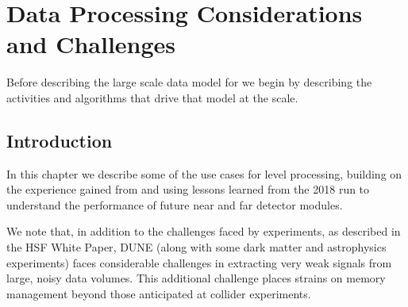 \documentclass[../main-v1.tex]{subfiles}
\begin{document}
\chapter{Data Processing Considerations and Challenges}%
\label{ch:use}
\newcommand{\ignore}[1]{{}}
Before describing the large scale data model for  we begin by describing the activities and algorithms that drive that model at the  scale. 

\section{Introduction }

In this chapter  we describe some of the use cases for  level processing,   %
building on the experience gained from   and   using lessons learned from the 2018 run to understand the performance of future near and far detector modules. 

We note that, in addition to the challenges faced by  experiments, as described in the HSF White Paper\cite{HEPSoftwareFoundation:2017ggl}, DUNE (along with some dark matter and astrophysics experiments) faces considerable challenges in extracting very weak signals from large, noisy data volumes.  This additional challenge places strains on memory management beyond those anticipated at collider experiments. 



\end{document}
